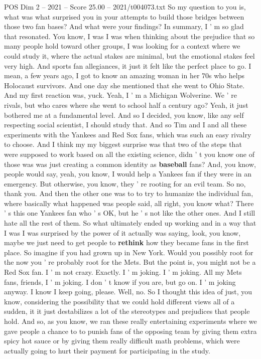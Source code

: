 \begin{textsample}{POS Dim 2 – 2021 – Score 25.00 – 2021/t004073.txt}
So my question to you is, what was what surprised you in your attempts to build those bridges between those two fan bases?
And what were your findings?
In summary, I ' m so glad that resonated.
You know, I was I was when thinking about the prejudice that so many people hold toward other groups, I was looking for a context where we could study it, where the actual stakes are minimal, but the emotional stakes feel very high.
And sports fan allegiances, it just it felt like the perfect place to go.
I mean, a few years ago, I got to know an amazing woman in her 70s who helps Holocaust survivors.
And one day she mentioned that she went to Ohio State.
And my first reaction was, yuck.
Yeah, I ' m a Michigan Wolverine.
We ' re rivals, but who cares where she went to school half a century ago?
Yeah, it just bothered me at a fundamental level.
And so I decided, you know, like any self respecting social scientist, I should study that.
And so Tim and I and all these experiments with the Yankees and Red Sox fans, which was such an easy rivalry to choose.
And I think my my biggest surprise was that two of the steps that were supposed to work based on all the existing science, didn ' t you know one of those was was just creating a common identity as \textbf{baseball} fans?
And, you know, people would say, yeah, you know, I would help a Yankees fan if they were in an emergency.
But otherwise, you know, they ' re rooting for an evil team.
So no, thank you.
And then the other one was to to try to humanize the individual fan, where basically what happened was people said, all right, you know what?
There ' s this one Yankees fan who ' s OK, but he ' s not like the other ones.
And I still hate all the rest of them.
So what ultimately ended up working and in a way that I was I was surprised by the power of it actually was saying, look, you know, maybe we just need to get people to \textbf{rethink} how they became fans in the first place.
So imagine if you had grown up in New York.
Would you possibly root for the now you ' re probably root for the Mets.
But the point is, you might not be a Red Sox fan.
I ' m not crazy.
Exactly.
I ' m joking.
I ' m joking.
All my Mets fans, friends, I ' m joking.
I don ' t know if you are, but go on.
I ' m joking anyway.
I know I keep going, please.
Well, no.
So I thought this idea of just, you know, considering the possibility that we could hold different views all of a sudden, it it just destabilizes a lot of the stereotypes and prejudices that people hold.
And so, as you know, we ran these really entertaining experiments where we gave people a chance to to punish fans of the opposing team by giving them extra spicy hot sauce or by giving them really difficult math problems, which were actually going to hurt their payment for participating in the study.

\end{textsample}
